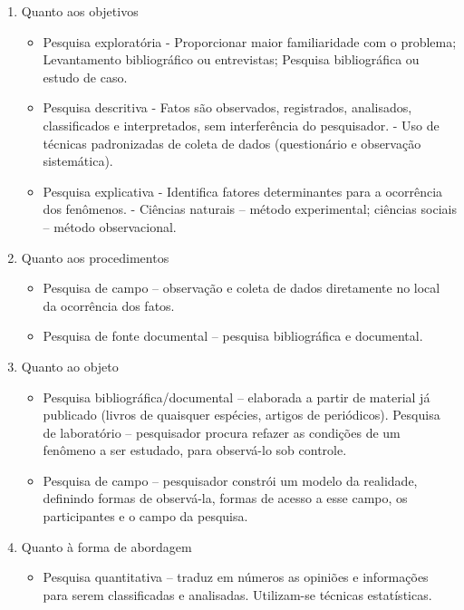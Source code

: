 \documentclass[
12pt,				%
openright,			%
oneside,
a4paper,			%
english,			%
french,				%
spanish,			%
brazil,				%
]{abntex2}
\begin{document}
\begin{enumerate}
\begin{enumerate}
\begin{itemize}
				\item Prática - embora semelhante à empírica, difere-se desta por se voltar a intervenções concretas no ambiente político, jurídico, ou sócio-cultural; transformações durante o trajeto da investigação ou análises que proponham novos rumos para a realidade social são os objetivos desse gênero.
			\end{itemize}
			\item
			Quanto aos objetivos
			\begin{itemize}
				\item Pesquisa exploratória
				- Proporcionar maior familiaridade com o problema;
				Levantamento bibliográfico ou entrevistas;
				Pesquisa bibliográfica ou estudo de caso.
				\item Pesquisa descritiva
				- Fatos são observados, registrados, analisados, classificados e interpretados, sem interferência do pesquisador.
				- Uso de técnicas padronizadas de coleta de dados (questionário e observação sistemática).
				\item Pesquisa explicativa
				- Identifica fatores determinantes para a ocorrência dos fenômenos.
				- Ciências naturais – método experimental; ciências sociais – método observacional.
			\end{itemize}
			\item  Quanto aos procedimentos
			\begin{itemize}
				\item Pesquisa de campo – observação e coleta de dados diretamente no local da ocorrência dos fatos.
				\item Pesquisa de fonte documental – pesquisa bibliográfica e documental.
			\end{itemize}
			
			\item
			Quanto ao objeto
			\begin{itemize}
				\item Pesquisa bibliográfica/documental – elaborada a partir de material já publicado (livros de quaisquer espécies, artigos de periódicos).
				Pesquisa de laboratório – pesquisador procura refazer as condições de um fenômeno a ser estudado, para observá-lo sob controle.
				\item Pesquisa de campo – pesquisador constrói um modelo da realidade, definindo formas de observá-la, formas de acesso a esse campo, os participantes e o campo da pesquisa.
			\end{itemize}
			
			\item
			Quanto à forma de abordagem
			\begin{itemize}
				\item Pesquisa quantitativa – traduz em números as opiniões e informações para serem classificadas e analisadas. Utilizam-se técnicas estatísticas.
				

\end{itemize}
\end{enumerate}
\end{enumerate}
\end{document}
